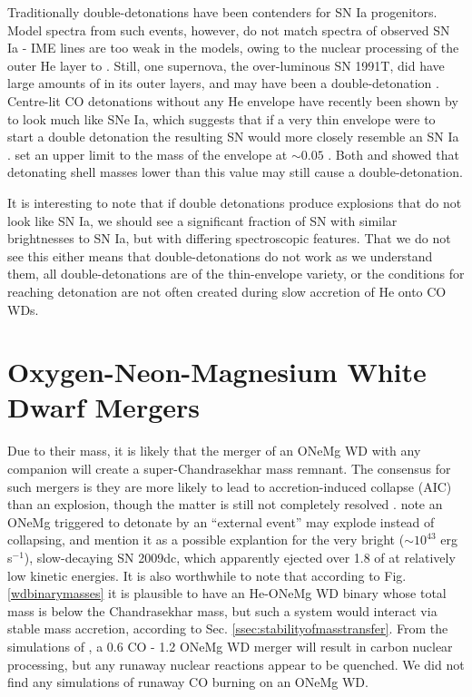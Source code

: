 Traditionally double-detonations have been contenders for SN Ia progenitors.  Model spectra from such events, however, do not match spectra of observed SN Ia - IME lines are too weak in the models, owing to the nuclear processing of the outer He layer to {\Ni} \citep{woosk10,finkhr07,vkercj10,howe10}.  Still, one supernova, the over-luminous SN 1991T, did have large amounts of {\Ni} in its outer layers, and may have been a double-detonation \citep{finkhr07}.  Centre-lit CO detonations without any He envelope have recently been shown by \cite{sim+10} to look much like SNe Ia, which suggests that if a very thin envelope were to start a double detonation the resulting SN would more closely resemble an SN Ia \citep{howe10}. \citeauthor{woosk10} set an upper limit to the mass of the envelope at $\sim 0.05$ {\Msun}.  Both \citeauthor{woosk10} and \citeauthor{fink+10} showed that detonating shell masses lower than this value may still cause a double-detonation.

It is interesting to note that if double detonations produce explosions that do not look like SN Ia, we should see a significant fraction of SN with similar brightnesses to SN Ia, but with differing spectroscopic features.  That we do not see this either means that double-detonations do not work as we understand them, all double-detonations are of the thin-envelope variety, or the conditions for reaching detonation are not often created during slow accretion of He onto CO WDs.






\section{Oxygen-Neon-Magnesium White Dwarf Mergers}
\label{sec:onemg}

Due to their mass, it is likely that the merger of an ONeMg WD with any companion will create a super-Chandrasekhar mass remnant.  The consensus for such mergers is they are more likely to lead to accretion-induced collapse (AIC) than an explosion, though the matter is still not completely resolved \citep{yoonpr07,frye+10,dess+06}.  \cite{taub+11} note an ONeMg triggered to detonate by an ``external event'' may explode instead of collapsing, and mention it as a possible explantion for the very bright ($\sim 10^{43}$ erg s$^{-1}$), slow-decaying SN 2009dc, which apparently ejected over 1.8 {\Msun} of {\Ni} at relatively low kinetic energies.  It is also worthwhile to note that according to Fig. \ref{wdbinarymasses} it is plausible to have an He-ONeMg WD binary whose total mass is below the Chandrasekhar mass, but such a system would interact via stable mass accretion, according to Sec. \ref{ssec:stabilityofmasstransfer}.  From the simulations of \citeauthor{loreig09}, a 0.6 CO - 1.2 ONeMg WD merger will result in carbon nuclear processing, but any runaway nuclear reactions appear to be quenched.  We did not find any simulations of runaway CO burning on an ONeMg WD.

